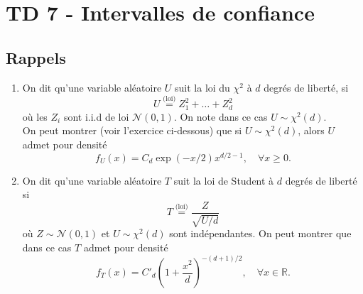 \chapter*{TD 7 - Intervalles de confiance}

\setcounter{exercice}{0}

\section*{Rappels}
\begin{enumerate}
    \item On dit qu'une variable aléatoire $U$ suit la loi du $\chi^2$ à $d$ degrés de liberté, si
    \begin{equation*}
    U \overset{\text{(loi)}}{=} Z_1^2 + \dots + Z_d^2
    \end{equation*}
    où les $Z_i$ sont i.i.d de loi $\mathcal{N}(0, 1)$. On note dans ce cas $U \sim \chi^2(d)$.\\
    On peut montrer (voir l'exercice ci-dessous) que si $U \sim \chi^2(d)$, alors $U$ admet pour densité
    \begin{equation*}
    f_U(x) = C_d \exp(-x/2) x^{d/2 - 1}, \quad \forall x \ge 0.
    \end{equation*}
    
    \item On dit qu'une variable aléatoire $T$ suit la loi de Student à $d$ degrés de liberté si
    \begin{equation*}
    T \overset{\text{(loi)}}{=} \frac{Z}{\sqrt{U/d}}
    \end{equation*}
    où $Z \sim \mathcal{N}(0, 1)$ et $U \sim \chi^2(d)$ sont indépendantes. On peut montrer que dans ce cas $T$ admet pour densité
    \begin{equation*}
    f_T(x) = C'_d \left( 1 + \frac{x^2}{d} \right)^{-(d+1)/2}, \quad \forall x \in \mathbb{R}.
    \end{equation*}
\end{enumerate}

\smallskip

